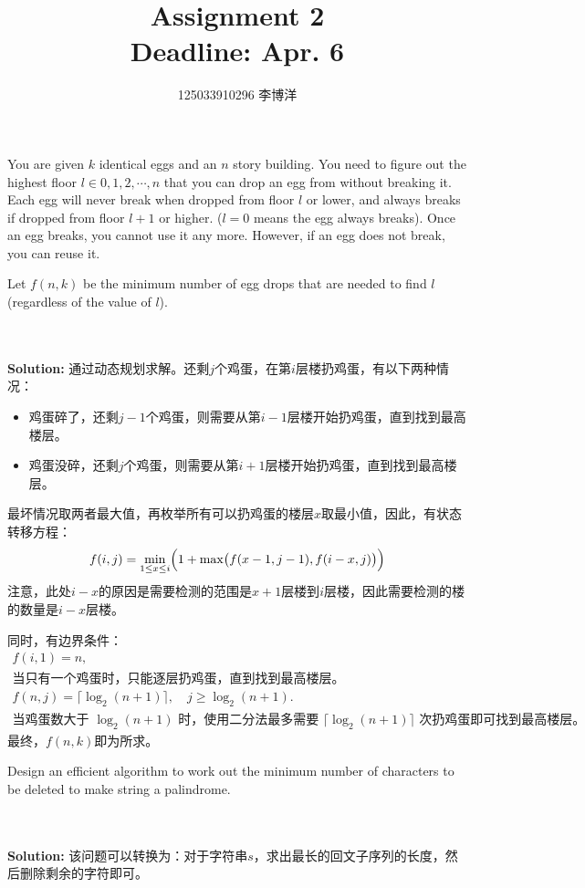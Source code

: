 \documentclass{article}
\title{{\bf Assignment 2} \\ {\large Deadline: Apr. 6}}
\author{125033910296 李博洋}
\date{}
\newcounter{exercise}
\newcommand{\<}{
    \langle}
\renewcommand{\>}{
    \rangle}
\begin{document}
\maketitle


{\large


\begin{exercise}
You are given $k$ identical eggs and an $n$ story building. You need to figure out the highest
floor $l \in {0, 1, 2, \cdots, n}$ that you can drop an egg from without breaking it. Each egg will
never break when dropped from floor $l$ or lower, and always breaks if dropped from floor
$l + 1$ or higher. ($l = $0 means the egg always breaks). Once an egg breaks, you cannot use it
any more. However, if an egg does not break, you can reuse it.

Let $f(n, k)$ be the minimum number of egg drops that are needed to find $l$ (regardless of
the value of $l$).
\end{exercise}
\\\\
\noindent\textbf{Solution:}
通过动态规划求解。还剩$j$个鸡蛋，在第$i$层楼扔鸡蛋，有以下两种情况：
\begin{itemize}
    \item 鸡蛋碎了，还剩$j-1$个鸡蛋，则需要从第$i-1$层楼开始扔鸡蛋，直到找到最高楼层。
    \item 鸡蛋没碎，还剩$j$个鸡蛋，则需要从第$i+1$层楼开始扔鸡蛋，直到找到最高楼层。
\end{itemize}
最坏情况取两者最大值，再枚举所有可以扔鸡蛋的楼层$x$取最小值，因此，有状态转移方程：
\begin{equation*}
f(i, j) = \min_{1\leq x\leq i}\Bigl(1 + \max\bigl(f(x-1, j-1), f(i-x, j)\bigr)\Bigr) \\
\end{equation*}
\noindent 注意，此处$i-x$的原因是需要检测的范围是$x+1$层楼到$i$层楼，因此需要检测的楼的数量是$i-x$层楼。

\noindent 同时，有边界条件：
\begin{gather*}
f(i, 1) = n, \\
\text{当只有一个鸡蛋时，只能逐层扔鸡蛋，直到找到最高楼层。} \\
f(n, j) = \lceil\log_2(n+1)\rceil, \quad j \geq \log_2(n+1). \\
\text{当鸡蛋数大于 $\log_2(n+1)$ 时，使用二分法最多需要 $\lceil\log_2(n+1)\rceil$ 次扔鸡蛋即可找到最高楼层。}
\end{gather*}
最终，$f(n, k)$即为所求。


\begin{exercise}
Design an efficient algorithm to work out the minimum number of characters to be deleted to make string a palindrome.
\end{exercise}
\\\\
\noindent\textbf{Solution:}
该问题可以转换为：对于字符串$s$，求出最长的回文子序列的长度，然后删除剩余的字符即可。

}
\end{document}
